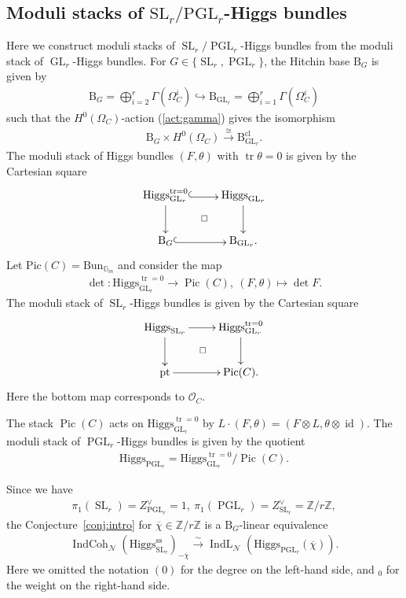 \documentclass[11pt,oneside,a4paper,mathscr]{amsart}
\makeatletter
\theoremstyle{definition}
\newcommand{\tr}{\operatorname{\mathrm{tr}}}
\newcommand{\Pic}{\operatorname{Pic}}
\newcommand{\diasquare}{\ar@{}[rd]|\square}
\newcommand{\rB}{\mathrm{B}}
\newcommand{\id}{\operatorname{id}}
\newcommand{\IndCoh}{\operatorname{IndCoh}}
\newcommand{\IndL}{\operatorname{IndL}}
\newcommand{\GL}{\operatorname{GL}}
\newcommand{\SL}{\operatorname{SL}}
\newcommand{\PGL}{\operatorname{PGL}}
\newcommand{\inclusion}{\ar@<-0.3ex>@{^{(}->}[r]}
\newcommand{\Hig}{\mathrm{Higgs}}
\newcommand{\Bun}{\mathrm{Bun}}
\makeatother
\begin{document}
\subsection[Moduli stacks of SLr/PGLr-Higgs bundles]{Moduli stacks of \texorpdfstring{$\mathrm{SL}_r/\mathrm{PGL}_r$}{SLr/PGLr}-Higgs bundles}
Here we construct moduli stacks of $\SL_r/\PGL_r$-Higgs bundles from the moduli 
stack of $\GL_r$-Higgs bundles. 
For $G\in \{\SL_r, \PGL_r\}$, the Hitchin base $\rB_G$ is given by 
\begin{align*}
    \rB_{G}=\bigoplus_{i=2}^r \Gamma(\Omega_C^i) \hookrightarrow 
    \rB_{\GL_r}=\bigoplus_{i=1}^r \Gamma(\Omega_C^i)
\end{align*}
such that the $H^0(\Omega_C)$-action (\ref{act:gamma}) gives the isomorphism 
\begin{align}\label{act:isom}
    \rB_{G}\times H^0(\Omega_C) \stackrel{\cong}{\to} \rB_{\GL_r}^{\mathrm{cl}}.
\end{align}
The moduli stack of Higgs bundles $(F, \theta)$ with $\tr\theta=0$
is given by the Cartesian square 
\begin{align*}
    \xymatrix{
\Hig_{\GL_r}^{\tr =0} \inclusion \ar[d]\diasquare  & \Hig_{\GL_r} \ar[d] \\
\rB_{G} \inclusion & \rB_{\GL_r}. 
    }
\end{align*}
Let $\mathrm{Pic}(C)=\Bun_{\mathbb{G}_m}$ and 
consider the map 
\begin{align*}
\det \colon 
    \Hig_{\GL_r}^{\tr=0} \to \Pic(C), \ (F, \theta)\mapsto \det F.
\end{align*}
The moduli stack of $\SL_r$-Higgs bundles is given by the Cartesian square 
\begin{align*}
    \xymatrix{
\Hig_{\SL_r} \ar[r] \ar[d] \diasquare & \Hig_{\GL_r}^{\tr=0} \ar[d] \\
\mathrm{pt} \ar[r]& \mathrm{Pic}(C). 
    }   
\end{align*}
Here the bottom map corresponds to $\mathcal{O}_C$. 

The stack $\Pic(C)$ acts on $\Hig_{\GL_r}^{\tr=0}$ by 
$L \cdot (F, \theta)=(F\otimes L, \theta\otimes \id)$. 
The moduli stack of $\PGL_r$-Higgs bundles is given by the quotient 
\begin{align*}
    \Hig_{\PGL_r}=\Hig_{\GL_r}^{\tr=0}/\Pic(C).
\end{align*}

Since we have 
\begin{align*}
    \pi_1(\SL_r)=Z_{\PGL_r}^{\vee}=1, \ 
    \pi_1(\PGL_r)=Z_{\SL_r}^{\vee}=\mathbb{Z}/r\mathbb{Z}, 
\end{align*}
the Conjecture~\ref{conj:intro} for $\overline{\chi} \in \mathbb{Z}/r\mathbb{Z}$
is a $\rB_{G}$-linear equivalence 
\begin{align*}
    \IndCoh_{\mathcal{N}}(\Hig_{\SL_r}^{\mathrm{ss}})_{-\overline{\chi}}
    \stackrel{\sim}{\to} \IndL_{\mathcal{N}}(\Hig_{\PGL_r}(\overline{\chi})).
\end{align*}
Here we omitted the notation $(0)$ for the degree on the left-hand side, 
and $_{0}$ for the weight on the right-hand side. 
\end{document}
